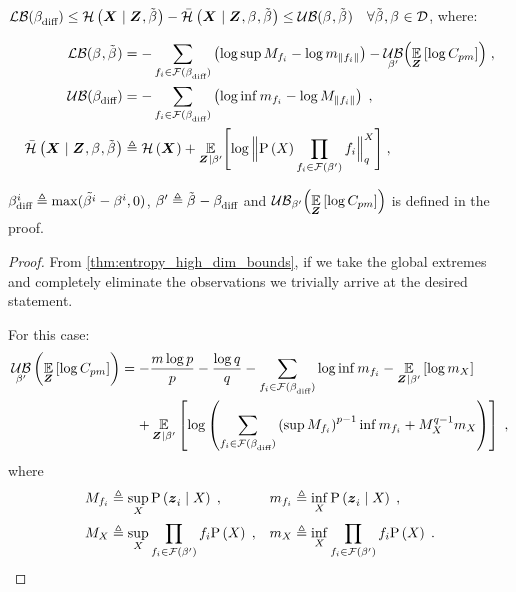 \begin{corollary}
	\label{thm:bounds_elim}
	$\operatorname*{\mathcal{LB}}(\beta_{\textup{diff}}^{})\leq\mathcal{H}\left({\boldsymbol X_{}}\mid{\ensuremath{\boldsymbol Z_{}},\tilde{\ensuremath{\beta_{}^{}}}}\right)-\bar{\mathcal{H}}_{}\left({\boldsymbol X_{}}\mid{\ensuremath{\boldsymbol Z_{}},\ensuremath{\beta_{}^{}},\tilde{\ensuremath{\beta_{}^{}}}}\right)\leq\operatorname*{\mathcal{UB}}(\beta_{}^{},\tilde{\beta_{}^{}})\quad\forall\tilde{\beta_{}^{}},\beta_{}^{}\in\mathcal{D}$, where:
	\begin{small}
		\begin{subequations}
			\begin{align}
				\operatorname*{\mathcal{LB}}(\beta_{}^{},\tilde{\beta_{}^{}}) & =-\sum_{f_i\in\mathcal{F}(\beta_{\textup{diff}}^{})}\left(\log\sup M_{f_i}-\log m_{\lVert f_i\rVert}\right)-\operatorname*{\mathcal{UB}}_{\beta_{}^{\prime}}\Bigl(\operatorname*{\mathbb{E}}\limits_{\boldsymbol Z_{}}\left[{\log C_{pm}}\right]\Bigr)\;,\\
				\operatorname*{\mathcal{UB}}(\beta_{\textup{diff}}^{}) & =-\sum_{f_i\in\mathcal{F}(\beta_{\textup{diff}}^{})}\left(\log\inf m_{f_i}-\log M_{\lVert f_i\rVert}\right)\;,\\
				\bar{\mathcal{H}}_{}\left({\boldsymbol X_{}}\mid{\ensuremath{\boldsymbol Z_{}},\ensuremath{\beta_{}^{}},\tilde{\ensuremath{\beta_{}^{}}}}\right)&\triangleq\mathcal{H}\left({\boldsymbol X_{}}\right) +\operatorname*{\mathbb{E}}_{\boldsymbol Z_{}{}\mid\beta_{}^{\prime}}\Biggl[{\log\Big\lVert{\ensuremath{\mathrm{P}\left({X_{}}\right)}\prod_{f_i\in\mathcal{F}(\ensuremath{\beta_{}^{\prime}})}f_i}\Big\rVert_{q}^{X_{}}}\Biggr]\;,
			\end{align}
		\end{subequations}
	\end{small}
	$\beta_{\textup{diff}}^{i}\triangleq\max(\tilde{\beta_{}^{i}}-\beta_{}^{i},0)$, $\beta_{}^{\prime}\triangleq\tilde{\beta_{}^{}}-\beta_{\textup{diff}}^{}$ and	$\operatorname*{\mathcal{UB}}_{\beta_{}^{\prime}}\Bigl(\operatorname*{\mathbb{E}}\limits_{\boldsymbol Z_{}}\left[{\log C_{pm}}\right]\Bigr)$ is defined in the proof.
\end{corollary}
\begin{proof}
	From \autoref{thm:entropy_high_dim_bounds}, if we take the global extremes and completely eliminate the observations we trivially arrive at the desired statement.

	For this case:
	\begin{equation*}
		\begin{split}
			\upperbound_{\da{}{\prime}}\left(\expectation{\log C_{pm}}{\observationsRV{}}\right)&=-\frac{m\log p}{p}-\frac{\log q}{q}-\sum_{f_i\in\mathcal{F}(\da{\textup{diff}}{})}\log \inf m_{f_i}-\expectation{\log m_{\states{}}}{\observationsRV{}{}\mid\da{}{\prime}}\\
			&\phantomeq+\E_{\observationsRV{}{}\mid\da{}{\prime}}\left[\log\left(\sum_{f_i\in\mathcal{F}(\da{\textup{diff}}{})}\left(\sup M_{f_i}\right)^{p-1}\inf m_{f_i}+M_{\states{}}^{q-1}m_{\states{}}\right)\right]\;,
		\end{split}
	\end{equation*}
	where
	\begin{align*}
		&M_{f_i}\triangleq\sup_{X_{}}\mathrm{P}\left({\boldsymbol z_{i}^{}}\mid{\ensuremath{X_{}}}\right)\;,&&
		m_{f_i}\triangleq\inf_{X_{}}\mathrm{P}\left({\boldsymbol z_{i}^{}}\mid{\ensuremath{X_{}}}\right)\;,
		\\
		&M_{X_{}}\triangleq\sup_{X_{}}\prod_{f_i\in\mathcal{F}(\beta_{}^{\prime})}f_i\mathrm{P}\left({X_{}}\right)\;,&&
		m_{X_{}}\triangleq\inf_{X_{}}\prod_{f_i\in\mathcal{F}(\beta_{}^{\prime})}f_i\mathrm{P}\left({X_{}}\right)\;.
	\end{align*}
\end{proof}

